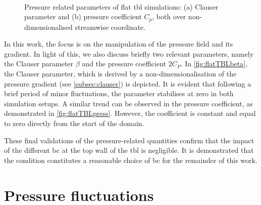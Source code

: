 \begin{figure}[h!]
\centering
\begin{subfigure}[t]{0.495\textwidth}
    \subcaption{}
    \centering
    
    \label{fig:flatTBLbeta}
\end{subfigure}
\hfill
\begin{subfigure}[t]{0.495\textwidth}
    \centering
    \subcaption{}
    
    \label{fig:flatTBLpress}
\end{subfigure}
\\[-15pt]
\caption[Pressure related parameters of the flat \acrshort{tbl} simulations]{Pressure related parameters of flat \acrshort{tbl} simulations: (a) Clauser parameter and (b) pressure coefficient $C_p$, both over non-dimensionalised streamwise coordinate.}
\end{figure}

In this work, the focus is on the manipulation of the pressure field and its gradient.
In light of this, we also discuss briefly two relevant parameters, namely the Clauser parameter $\beta$ and the pressure coefficient $2C_P$.
In \autoref{fig:flatTBLbeta}, the Clauser parameter, which is derived by a non-dimensionalisation of the pressure gradient (see \autoref{subsec:clauser}) is depicted.
It is evident that following a brief period of minor fluctuations, the parameter stabilises at zero in both simulation setups.
A similar trend can be observed in the pressure coefficient, as demonstrated in \autoref{fig:flatTBLpress}.
However, the coefficient is constant and equal to zero directly from the start of the domain. 

These final validations of the pressure-related quantities confirm that the impact of the different \acrshort{bc} at the top wall of the \acrshort{tbl} is negligible.
It is demonstrated that the  condition constitutes a reasonable choice of \acrshort{bc} for the remainder of this work.


\section{Pressure fluctuations} \label{sec:pressFluc}


